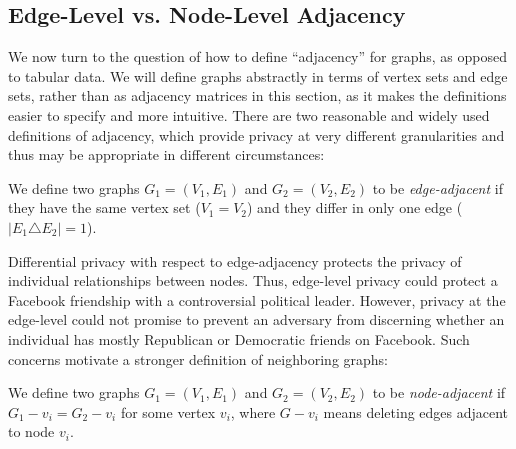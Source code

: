 

\subsection{Edge-Level vs. Node-Level Adjacency}

We now turn to the question of how to define ``adjacency'' for graphs, as opposed to tabular data. We will define graphs abstractly in terms of vertex sets and edge sets, rather than as adjacency matrices in this section, as it makes the definitions easier to specify and more intuitive. There are two reasonable and widely used definitions of adjacency, which provide privacy at very different granularities and thus may be appropriate in different circumstances: 

\begin{definition}
\label{def:edge_level}
We define two graphs $G_1 = (V_1, E_1)$ and $G_2 = (V_2, E_2)$ to be \emph{edge-adjacent} if they have the same vertex set ($V_1 = V_2$) and they differ in only one edge ($\left| E_1 \triangle E_2   \right| = 1$). 
\end{definition}
Differential privacy with respect to edge-adjacency protects the privacy of individual relationships between nodes. Thus, edge-level privacy could protect a Facebook friendship with a controversial political leader. However, privacy at the edge-level could not promise to prevent an adversary from discerning whether an individual has mostly Republican or Democratic friends on Facebook. Such concerns motivate a stronger definition of neighboring graphs:

\begin{definition}
\label{def:node_level}
We define two graphs $G_1 = (V_1, E_1)$ and $G_2 = (V_2, E_2)$ to be \emph{node-adjacent} if $G_1-v_i = G_2-v_i$ for some vertex $v_i$, where $G-v_i$ means deleting edges adjacent to node $v_i$.
\end{definition}

